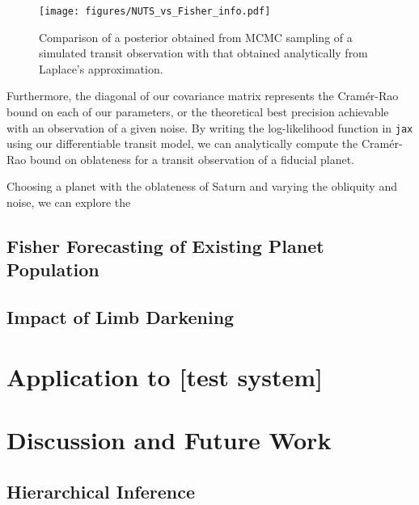 \documentclass[twocolumn]{aastex631}
\begin{document}
\begin{figure}[ht!]
    \begin{centering}
        \texttt{[image: figures/NUTS\_vs\_Fisher\_info.pdf]}
        \caption{Comparison of a posterior obtained from MCMC sampling of a simulated transit observation with that obtained analytically from Laplace's approximation.}
        \label{fig:fishercorner}
    \end{centering}
\end{figure}
Furthermore, the diagonal of our covariance matrix represents the Cramér-Rao bound on each of our parameters, or the theoretical best precision achievable with an observation of a given noise. By writing the log-likelihood function in \texttt{jax} using our differentiable transit model, we can analytically compute the Cramér-Rao bound on oblateness for a transit observation of a fiducial planet. 

Choosing a planet with the oblateness of Saturn and varying the obliquity and noise, we can explore the 

\subsection{Fisher Forecasting of Existing Planet Population}
\label{sec:fisherforecasting}
\subsection{Impact of Limb Darkening}
\section{Application to [test system]}
\label{sec:lctest}
\section{Discussion and Future Work}
\label{disc}
\subsection{Hierarchical Inference}

\end{document}

